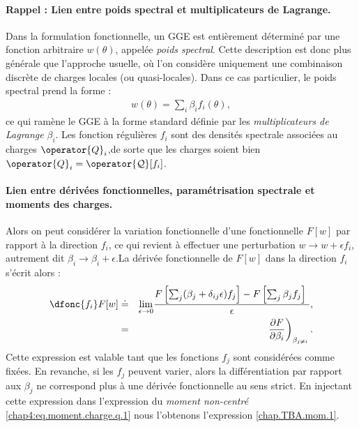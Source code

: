 \begin{mdframed}[
	linewidth=0.5pt, 
	backgroundcolor=gray!5, 
	roundcorner=50pt,	
	innerleftmargin=5pt,
    innerrightmargin=5pt,
    innertopmargin=-10pt,
    innerbottommargin=2pt,
    leftmargin=2pt,
    rightmargin=2pt
	]
\paragraph{Rappel : Lien entre poids spectral et multiplicateurs de Lagrange.}
Dans la formulation fonctionnelle, un \gls{GGE} est entièrement déterminé par une fonction arbitraire $w(\theta)$, appelée {\em poids spectral}. Cette description est donc plus générale que l’approche usuelle, où l’on considère uniquement une combinaison discrète de charges locales (ou quasi-locales). Dans ce cas particulier, le poids spectral prend la forme :
\begin{eqnarray}\label{chap4:eq.w_fi}
	w(\theta) = \sum_i \beta_i f_i(\theta),	
\end{eqnarray}
ce qui ramène le \gls{GGE} à la forme standard définie par les {\em multiplicateurs de Lagrange} $\beta_i$. Les fonction régulières $f_i$ sont des densités spectrale associées au charges $\operator{Q}_i$,de sorte que les charges soient bien $\operator{Q}_i = \operator{\mathcal{Q}}[f_i] $.

\end{mdframed}
	
\paragraph{Lien entre dérivées fonctionnelles, paramétrisation spectrale et moments des charges.}

\medskip

Alors on peut considérer la variation fonctionnelle d'une fonctionnelle $F[w]$ par rapport à la direction $f_i$, ce qui revient à effectuer une perturbation $w \rightarrow w + \epsilon f_i$, autrement dit $\beta_i \rightarrow \beta_i + \epsilon$.La dérivée fonctionnelle de $F[w]$ dans la direction $f_i$ s’écrit alors :
\begin{eqnarray}\label{chap4:eq.w_fi_dif}
	\dfonc{f_i} F[w]  &\doteq &  \underset{\epsilon \to 0 }{ \lim  } \frac{ F\left[\sum_j ( \beta_j + \delta_{ij} \epsilon) f_j \right]  - F \left[\sum_j  \beta_j f_j\right] }{\epsilon},\\
	& = & \left. \frac{ \partial F}{ \partial \beta_i } \right)_{\beta_{j\neq i} }.	
\end{eqnarray}
Cette expression est valable tant que les fonctions $f_j$ sont considérées comme fixées. En revanche, si les $f_j$ peuvent varier, alors la différentiation par rapport aux $\beta_j$ ne correspond plus à une dérivée fonctionnelle au sens strict.
En injectant cette expression dans l'expression du {\em moment non-centré} \eqref{chap4:eq.moment.charge.q.1} nous l'obtenons l'expression \eqref{chap.TBA.mom.1}. %


